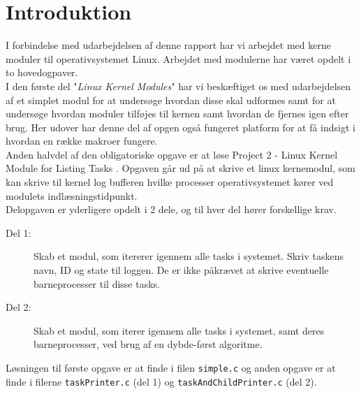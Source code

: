 \documentclass[main.tex]{subfile}
\begin{document}
\section{Introduktion}
I forbindelse med udarbejdelsen af denne rapport har vi arbejdet med kerne moduler til operativsystemet Linux. Arbejdet med modulerne har været opdelt i to hovedogpaver.\\ 

I den første del "\emph{Linux Kernel Modules}" \cite[s.94]{SA:2013} har vi beskæftiget os med udarbejdelsen af et simplet modul for at undersøge hvordan disse skal udformes samt for at undersøge hvordan moduler tilføjes til kernen samt hvordan de fjernes igen efter brug. Her udover har denne del af opgen også fungeret platform for at få indsigt i hvordan en række makroer fungere.\\

Anden halvdel af den obligatoriske opgave er at løse Project 2 - Linux Kernel Module for Listing Tasks \cite[s.156-158]{SA:2013}. Opgaven går ud på at skrive et linux kernemodul, som kan skrive til kernel log bufferen hvilke processer operativsystemet kører ved modulets indlæsningstidpunkt.\\

Delopgaven er yderligere opdelt i 2 dele, og til hver del hører forskellige krav.

\begin{description}
\item[Del 1:] Skab et modul, som itererer igennem alle tasks i systemet. Skriv taskens navn, ID og state til loggen. De er ikke påkrævet at skrive eventuelle barneprocesser til disse tasks.
\item[Del 2:] Skab et modul, som iterer igennem alle tasks i systemet, samt deres barneprocesser, ved brug af en dybde-først algoritme.
\end{description}

Løsningen til første opgave er at finde i filen \texttt{simple.c} og anden opgave er at finde i filerne \texttt{taskPrinter.c} (del 1) og \texttt{taskAndChildPrinter.c} (del 2).
\end{document}
